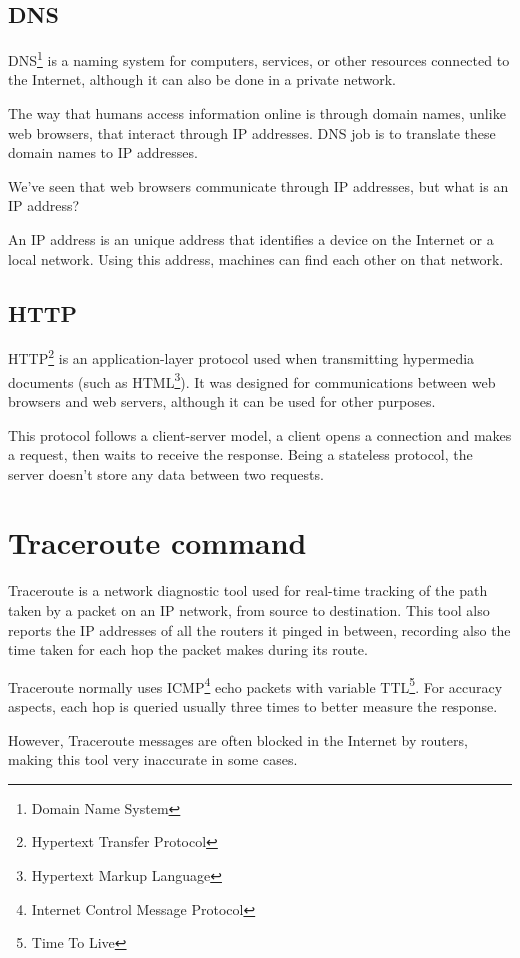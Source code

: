 \documentclass{article}
\newcommand\tab[1][1cm]{\hspace*{#1}}
\begin{document}
\subsection{DNS} 

\tab DNS\footnote{Domain Name System} is a naming system for computers, services, or other resources connected to the Internet, although it can also be done in a private network.

The way that humans access information online is through domain names, unlike web browsers, that interact through IP addresses. DNS job is to translate these domain names to IP addresses.

We've seen that web browsers communicate through IP addresses, but what is an IP address?

An IP address is an unique address that identifies a device on the Internet or a local network. Using this address, machines can find each other on that network.

\subsection{HTTP}

\tab HTTP\footnote{Hypertext Transfer Protocol} is an application-layer protocol used when transmitting hypermedia documents (such as HTML\footnote{Hypertext Markup Language}). It was designed for communications between web browsers and web servers, although it can be used for other purposes. 

This protocol follows a client-server model, a client opens a connection and makes a request, then waits to receive the response. Being a stateless protocol, the server doesn't store any data between two requests.

\section{Traceroute command}

\tab Traceroute is a network diagnostic tool used for real-time tracking of the path taken by a packet on an IP network, from source to destination. This tool also reports the IP addresses of all the routers it pinged in between, recording also the time taken for each hop the packet makes during its route.

Traceroute normally uses ICMP\footnote{Internet Control Message Protocol} echo packets with variable TTL\footnote{Time To Live}. For accuracy aspects, each hop is queried usually three times to better measure the response. 

However, Traceroute messages are often blocked in the Internet by routers, making this tool very inaccurate in some cases.

\nocite{*}
\printbibliography
\end{document}
